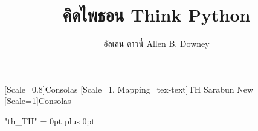 \usepackage{polyglossia}
\setdefaultlanguage{thai} %
\newfontfamily{}
\newfontfamily{}
\setmainfont[Scale=1.0]{TH Sarabun New:Script=Thai}
\newfontfamily{\thaifonttt}[Scale=0.8]{Consolas} %
\newfontfamily{\thaifont}[Scale=1, Mapping=tex-text]{TH Sarabun New} %
\newfontfamily{\englishfonttt}[Scale=1]{Consolas} %


\newcommand\atom[1]{\noindent\mbox{#1}\noindent}

\usepackage[Latin,Thai]{ucharclasses} %


\XeTeXlinebreaklocale "th_TH" %
\XeTeXlinebreakskip = 0pt plus 0pt




\title{คิดไพธอน Think Python}
\author{อัลเลน ดาวนี่ Allen B. Downey}
\newcommand{\thetitle}{Think Python: How to Think Like a Computer Scientist}
\newcommand{\thedate}{}



\makeindex

\newif\ifplastex
\plastexfalse



\usepackage{fancyvrb} 





\newcommand{\dqb}{“}
\newcommand{\dqe}{”}
\newcommand{\sqb}{‘}
\newcommand{\sqe}{’}



